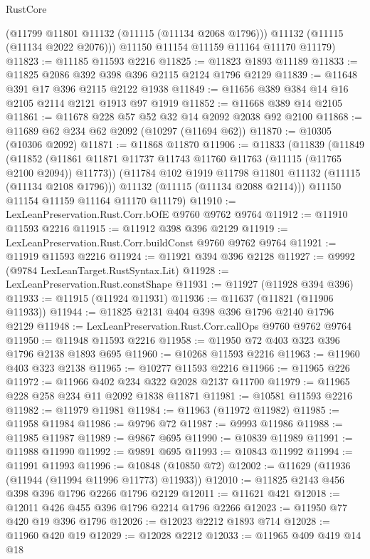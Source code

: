 \begin{lexlean}{RustCore}
\begin{coremodule}
        (@11799 @11801 @11132 (@11115 (@11134 @2068 @1796)))
        @11132
        (@11115 (@11134 @2022 @2076)))
      @11150
      @11154
      @11159
      @11164
      @11170
      @11179)
@11823 := @11185 @11593 @2216
@11825 := @11823 @1893 @11189
@11833 := @11825 @2086 @392 @398 @396 @2115 @2124 @1796 @2129
@11839 := @11648 @391 @17 @396 @2115 @2122 @1938
@11849 := @11656 @389 @384 @14 @16 @2105 @2114 @2121 @1913 @97 @1919
@11852 := @11668 @389 @14 @2105
@11861 := @11678 @228 @57 @52 @32 @14 @2092 @2038 @92 @2100
@11868 := @11689 @62 @234 @62 @2092 (@10297 (@11694 @62))
@11870 := @10305 (@10306 @2092)
@11871 := @11868 @11870
@11906 := @11833
    (@11839
      (@11849
        (@11852 (@11861 @11871 @11737 @11743 @11760 @11763 (@11115 (@11765 @2100 @2094)) @11773))
        (@11784 @102 @1919 @11798 @11801 @11132 (@11115 (@11134 @2108 @1796)))
        @11132
        (@11115 (@11134 @2088 @2114)))
      @11150
      @11154
      @11159
      @11164
      @11170
      @11179)
@11910 := LexLeanPreservation.Rust.Corr.bOfE @9760 @9762 @9764
@11912 := @11910 @11593 @2216
@11915 := @11912 @398 @396 @2129
@11919 := LexLeanPreservation.Rust.Corr.buildConst @9760 @9762 @9764
@11921 := @11919 @11593 @2216
@11924 := @11921 @394 @396 @2128
@11927 := @9992 (@9784 LexLeanTarget.RustSyntax.Lit)
@11928 := LexLeanPreservation.Rust.constShape
@11931 := @11927 (@11928 @394 @396)
@11933 := @11915 (@11924 @11931)
@11936 := @11637 (@11821 (@11906 @11933))
@11944 := @11825 @2131 @404 @398 @396 @1796 @2140 @1796 @2129
@11948 := LexLeanPreservation.Rust.Corr.callOps @9760 @9762 @9764
@11950 := @11948 @11593 @2216
@11958 := @11950 @72 @403 @323 @396 @1796 @2138 @1893 @695
@11960 := @10268 @11593 @2216
@11963 := @11960 @403 @323 @2138
@11965 := @10277 @11593 @2216
@11966 := @11965 @226
@11972 := @11966 @402 @234 @322 @2028 @2137 @11700
@11979 := @11965 @228 @258 @234 @11 @2092 @1838 @11871
@11981 := @10581 @11593 @2216
@11982 := @11979 @11981
@11984 := @11963 (@11972 @11982)
@11985 := @11958 @11984
@11986 := @9796 @72
@11987 := @9993 @11986
@11988 := @11985 @11987
@11989 := @9867 @695
@11990 := @10839 @11989
@11991 := @11988 @11990
@11992 := @9891 @695
@11993 := @10843 @11992
@11994 := @11991 @11993
@11996 := @10848 (@10850 @72)
@12002 := @11629 (@11936 (@11944 (@11994 @11996 @11773) @11933))
@12010 := @11825 @2143 @456 @398 @396 @1796 @2266 @1796 @2129
@12011 := @11621 @421
@12018 := @12011 @426 @455 @396 @1796 @2214 @1796 @2266
@12023 := @11950 @77 @420 @19 @396 @1796
@12026 := @12023 @2212 @1893 @714
@12028 := @11960 @420 @19
@12029 := @12028 @2212
@12033 := @11965 @409 @419 @14 @18

\end{coremodule}
\end{lexlean}
